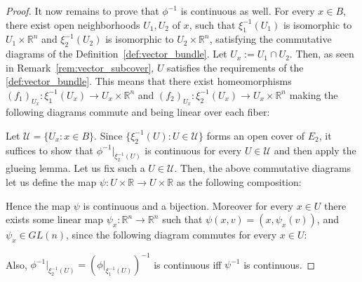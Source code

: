 \begin{proof}
It now remains to prove that $\phi^{-1}$ is continuous as well. For every $x\in B$, there exist open neighborhoods $U_1,U_2$ of $x$, such that $\xi_1^{-1}(U_1)$ is isomorphic to $U_1\times\mathbb{R}^n$ and $\xi_2^{-1}(U_2)$ is isomorphic to $U_2\times\mathbb{R}^n$, satisfying the commutative diagrams of the Definition~\ref{def:vector_bundle}. Let $U_x:=U_1\cap U_2$. Then, as seen in Remark~\ref{rem:vector_subcover}, $U$ satisfies the requirements of the \ref{def:vector_bundle}. This means that there exist homeomorphisms $(f_1)_{U_x}:\xi_1^{-1}(U_x)\to U_x\times\mathbb{R}^n$ and $(f_2)_{U_x}:\xi_2^{-1}(U_x)\to U_x\times\mathbb{R}^n$ making the following diagrams commute and being linear over each fiber:
\begin{center}
\end{center}
Let $\mathcal{U}=\{U_x:x\in B\}$. Since $\{\xi_2^{-1}(U):U\in\mathcal{U}\}$ forms an open cover of $E_2$, it suffices to show that $\phi^{-1}|_{\xi_2^{-1}(U)}$ is continuous for every $U\in\mathcal{U}$ and then apply the glueing lemma. Let us fix such a $U\in\mathcal{U}$. Then, the above commutative diagrams let us define the map $\psi:U\times\mathbb{R}\to U\times\mathbb{R}$ as the following composition:
\vspace*{-1em}
\begin{center}
\end{center}
Hence the map $\psi$ is continuous and a bijection. Moreover for every $x\in U$ there exists some linear map $\psi_x:\mathbb{R}^n\to\mathbb{R}^n$ such that $\psi(x,v)=(x,\psi_x(v))$, and $\psi_x\in GL(n)$, since the following diagram commutes for every $x\in U$:
\vspace*{-1em}
\begin{center}
\end{center}
Also, $\phi^{-1}|_{\xi_2^{-1}(U)}=(\phi|_{\xi_1^{-1}(U)})^{-1}$ is continuous iff $\psi^{-1}$ is continuous.


\end{proof}
